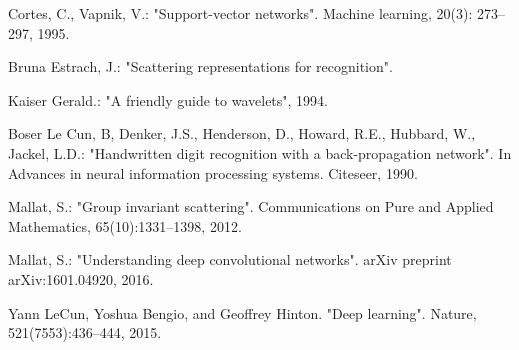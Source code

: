 \documentclass{article}
\begin{document}
\begin{thebibliography}{99}
 Cortes, C., Vapnik, V.: "Support-vector networks". Machine learning, 20(3): 273–297, 1995.

 Bruna Estrach, J.: "Scattering representations for recognition".

 Kaiser Gerald.: "A friendly guide to wavelets", 1994.

 Boser Le Cun, B, Denker, J.S., Henderson, D., Howard, R.E., Hubbard, W., Jackel, L.D.: "Handwritten digit recognition with a back-propagation network". In Advances in neural information processing systems. Citeseer, 1990.

 Mallat, S.: "Group invariant scattering". Communications on Pure and Applied Mathematics, 65(10):1331–1398, 2012.

 Mallat, S.: "Understanding deep convolutional networks". arXiv preprint arXiv:1601.04920, 2016.

 Yann LeCun, Yoshua Bengio, and Geoffrey Hinton. "Deep learning". Nature, 521(7553):436–444, 2015.
\end{thebibliography}
\end{document}
